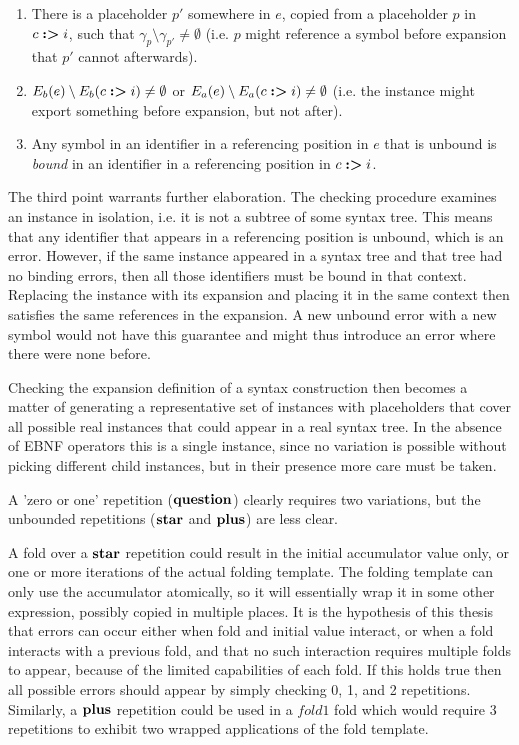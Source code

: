 \documentclass{kththesis}
\begin{document}
\begin{enumerate}
  \item There is a placeholder $p'$ somewhere in $e$, copied from a placeholder $p$ in $c \mathrel{\textbf{:>}} i$, such that $\gamma_p \setminus \gamma_{p'} \neq \emptyset$ (i.e. $p$ might reference a symbol before expansion that $p'$ cannot afterwards).
  \item $E_b(e) \setminus E_b(c \mathrel{\textbf{:>}} i) \neq \emptyset$ or $E_a(e) \setminus E_a(c \mathrel{\textbf{:>}} i) \neq \emptyset$ (i.e. the instance might export something before expansion, but not after).
  \item Any symbol in an identifier in a referencing position in $e$ that is unbound is \emph{bound} in an identifier in a referencing position in $c \mathrel{\textbf{:>}} i$.
\end{enumerate}

The third point warrants further elaboration. The checking procedure examines an instance in isolation, i.e. it is not a subtree of some syntax tree. This means that any identifier that appears in a referencing position is unbound, which is an error. However, if the same instance appeared in a syntax tree and that tree had no binding errors, then all those identifiers must be bound in that context. Replacing the instance with its expansion and placing it in the same context then satisfies the same references in the expansion. A new unbound error with a new symbol would not have this guarantee and might thus introduce an error where there were none before.

Checking the expansion definition of a syntax construction then becomes a matter of generating a representative set of instances with placeholders that cover all possible real instances that could appear in a real syntax tree. In the absence of EBNF operators this is a single instance, since no variation is possible without picking different child instances, but in their presence more care must be taken.

A 'zero or one' repetition ($\mathrel{\mathbf{question}}$) clearly requires two variations, but the unbounded repetitions ($\mathrel{\mathbf{star}}$ and $\mathrel{\mathbf{plus}}$) are less clear.

A fold over a $\mathrel{\mathbf{star}}$ repetition could result in the initial accumulator value only, or one or more iterations of the actual folding template. The folding template can only use the accumulator atomically, so it will essentially wrap it in some other expression, possibly copied in multiple places. It is the hypothesis of this thesis that errors can occur either when fold and initial value interact, or when a fold interacts with a previous fold, and that no such interaction requires multiple folds to appear, because of the limited capabilities of each fold. If this holds true then all possible errors should appear by simply checking 0, 1, and 2 repetitions. Similarly, a $\mathrel{\mathbf{plus}}$ repetition could be used in a $\mathit{fold1}$ fold which would require 3 repetitions to exhibit two wrapped applications of the fold template.
\end{document}
